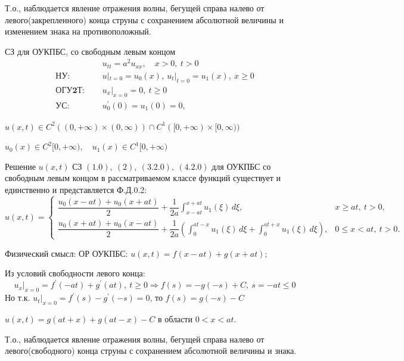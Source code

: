 Т.о., наблюдается явление отражения волны, бегущей справа налево от левого(закрепленного) конца струны с сохранением абсолютной величины и изменением знака на противоположный.

СЗ для ОУКПБС, со свободным левым концом
\begin{align*}
	                       & u_{tt} = a^2 u_{xx}, \quad x > 0,\ t > 0 \tag{1.0}    \\
	\textbf{НУ: } \quad    & u|_{t=0}=u_0(x),\ u_t|_{t=0}=u_1(x),\ x \ge 0 \tag{2} \\
	\textbf{ОГУ2Т: } \quad & u_x|_{x=0}=0,\ t \ge 0 \tag{3.2.0}                    \\
	\textbf{УС: } \quad    & u_0^{'}(0)=u_1(0)=0, \tag{4.2.0}
\end{align*}

$u(x, t) \in C^2((0, +\infty) \times (0, \infty)) \cap C^1([0, +\infty) \times [0, \infty))$

$u_0(x) \in C^2[0, +\infty),\quad u_1(x) \in C^1[0, +\infty)$

\begin{theorem}
	Решение $u(x, t)$ СЗ $(1.0),\ (2),\ (3.2.0),\ (4.2.0)$ для ОУКПБС со свободным левым концом в рассматриваемом классе функций существует и единственно и представляется Ф.Д.0.2:
	\[
		u(x,t)=
		\begin{cases}
			\dfrac{u_0(x-at)+u_0(x+at)}{2}+\dfrac{1}{2a}\displaystyle\int_{x-at}^{x+at} u_1(\xi)\,d\xi,                                                       & x\ge at,\ t>0,   \\[1.2em]
			\dfrac{u_0(x+at)+u_0(x-at)}{2}+\dfrac{1}{2a}\left(\displaystyle\int_{0}^{at-x} u_1(\xi)\,d\xi+\displaystyle\int_{0}^{at+x} u_1(\xi)\,d\xi\right), & 0\le x<at,\ t>0.
		\end{cases}
	\]
\end{theorem}

Физический смысл: ОР ОУКПБС: $u(x, t) = f(x-at) + g(x+at);$

Из условий свободности левого конца:
\[
	u_x|_{x=0} = f^{'}(-at) + g^{'}(at),\ t \ge 0 \Rightarrow f(s) = -g(-s) + C,\ s = -at \le 0
\]
Но т.к. $u_t|_{x=0} = f^{'}(s) - g^{'}(-s) = 0$, то $f(s) = g(-s) - C$

$u(x, t) = g(at + x) + g(at - x) - C$ в области $0 < x < at$.

Т.о., наблюдается явление отражения волны, бегущей справа налево от левого(свободного) конца струны с сохранением абсолютной величины и знака.
